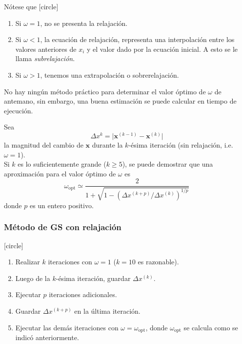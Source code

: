 \begin{frame}
Nótese que
[circle]
\begin{enumerate}[<+->]
\item  Si $\omega=1$, no se presenta la relajación.
\item Si $\omega<1$, la ecuación de relajación, representa una interpolación entre los valores anteriores de $x_{i}$ y el valor dado por la ecuación inicial. A esto se le llama \emph{subrelajación}.
\item Si $\omega>1$, tenemos una extrapolación o sobrerelajación.
\end{enumerate}
\end{frame}
\begin{frame}
No hay ningún método práctico para determinar el valor óptimo de $\omega$ de antemano, sin embargo, una buena estimación se puede calcular en tiempo de ejecución.
\end{frame}
\begin{frame}
Sea
\[ \Delta x^{k} = \vert \mathbf{x}^{(k-1)} - \mathbf{x}^{(k)} \vert \]
la magnitud del cambio de $\mathbf{x}$ durante la $k$-ésima iteración (sin relajación, i.e. $\omega=1$).
\\
\medskip
Si $k$ es lo suficientemente grande ($k\geqslant5$), se puede demostrar que una aproximación para el valor óptimo de $\omega$ es
\[ \omega_{\mbox{opt}} \simeq \dfrac{2}{1 + \sqrt{1- (\Delta x^{(k+p)} / \Delta x^{(k)})^{1/p}}} \]
donde $p$ es un entero positivo.
\end{frame}
\begin{frame}
\frametitle{Método de GS con relajación}
[circle]
\begin{enumerate}[<+->]
\item Realizar $k$ iteraciones con $\omega=1$ ($k=10$ es razonable).
\item Luego de la $k$-ésima iteración, guardar $\Delta x^{(k)}$.
\item Ejecutar $p$ iteraciones adicionales.
\item Guardar $\Delta x^{(k+p)}$ en la última iteración.
\item Ejecutar las demás iteraciones con $\omega = \omega_{\mbox{opt}}$, donde $\omega_{\mbox{opt}}$ se calcula como se indicó anteriormente.
\end{enumerate}
\end{frame}

